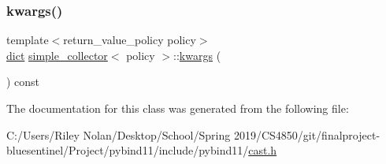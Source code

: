 \subsubsection{\texorpdfstring{kwargs()}{kwargs()}}
{\footnotesize\ttfamily template$<$return\+\_\+value\+\_\+policy policy$>$ \\
\mbox{\hyperlink{classdict}{dict}} \mbox{\hyperlink{classsimple__collector}{simple\+\_\+collector}}$<$ policy $>$\+::\mbox{\hyperlink{classkwargs}{kwargs}} (\begin{DoxyParamCaption}{ }\end{DoxyParamCaption}) const\hspace{0.3cm}{\ttfamily [inline]}}



The documentation for this class was generated from the following file\+:\begin{DoxyCompactItemize}
\item 
C\+:/\+Users/\+Riley Nolan/\+Desktop/\+School/\+Spring 2019/\+C\+S4850/git/finalproject-\/bluesentinel/\+Project/pybind11/include/pybind11/\mbox{\hyperlink{cast_8h}{cast.\+h}}\end{DoxyCompactItemize}
